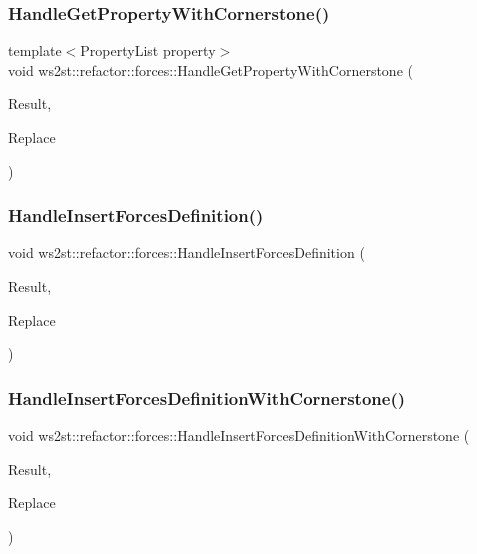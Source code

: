 \subsubsection{\texorpdfstring{Handle\+Get\+Property\+With\+Cornerstone()}{HandleGetPropertyWithCornerstone()}}
{\footnotesize\ttfamily template$<$Property\+List property$>$ \\
void ws2st\+::refactor\+::forces\+::\+Handle\+Get\+Property\+With\+Cornerstone (\begin{DoxyParamCaption}\item[{const Match\+Finder\+::\+Match\+Result \&}]{Result,  }\item[{Replacements \&}]{Replace }\end{DoxyParamCaption})}

\mbox{\label{namespacews2st_1_1refactor_1_1forces_a664ea291bdcb81f90151e9ce2a8ed12d}} 
\subsubsection{\texorpdfstring{Handle\+Insert\+Forces\+Definition()}{HandleInsertForcesDefinition()}}
{\footnotesize\ttfamily void ws2st\+::refactor\+::forces\+::\+Handle\+Insert\+Forces\+Definition (\begin{DoxyParamCaption}\item[{const Match\+Finder\+::\+Match\+Result \&}]{Result,  }\item[{Replacements \&}]{Replace }\end{DoxyParamCaption})}

\mbox{\label{namespacews2st_1_1refactor_1_1forces_a0854faeb74d0977f0a889bef65ecc70b}} 
\subsubsection{\texorpdfstring{Handle\+Insert\+Forces\+Definition\+With\+Cornerstone()}{HandleInsertForcesDefinitionWithCornerstone()}}
{\footnotesize\ttfamily void ws2st\+::refactor\+::forces\+::\+Handle\+Insert\+Forces\+Definition\+With\+Cornerstone (\begin{DoxyParamCaption}\item[{const Match\+Finder\+::\+Match\+Result \&}]{Result,  }\item[{Replacements \&}]{Replace }\end{DoxyParamCaption})}

